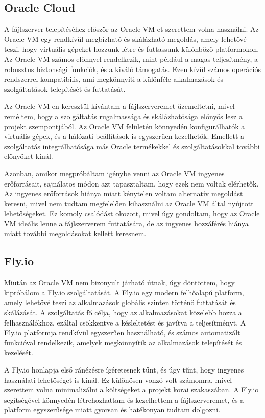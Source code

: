 \subsection{Oracle Cloud}
A fájlszerver telepítéséhez először az Oracle VM-et \cite{CloudInf58:online} szerettem volna használni. Az Oracle VM egy rendkívül megbízható és skálázható megoldás, amely lehetővé teszi, hogy virtuális gépeket hozzunk létre és futtassunk különböző platformokon. Az Oracle VM számos előnnyel rendelkezik, mint például a magas teljesítmény, a robusztus biztonsági funkciók, és a kiváló támogatás. Ezen kívül számos operációs rendszerrel kompatibilis, ami megkönnyíti a különféle alkalmazások és szolgáltatások telepítését és futtatását.

Az Oracle VM-en keresztül kívántam a fájlszerveremet üzemeltetni, mivel reméltem, hogy a szolgáltatás rugalmassága és skálázhatósága előnyös lesz a projekt szempontjából. Az Oracle VM felületén könnyedén konfigurálhatók a virtuális gépek, és a hálózati beállítások is egyszerűen kezelhetők. Emellett a szolgáltatás integrálhatósága más Oracle termékekkel és szolgáltatásokkal további előnyöket kínál.

Azonban, amikor megpróbáltam igénybe venni az Oracle VM ingyenes erőforrásait, sajnálatos módon azt tapasztaltam, hogy ezek nem voltak elérhetők. Az ingyenes erőforrások hiánya miatt kénytelen voltam alternatív megoldást keresni, mivel nem tudtam megfelelően kihasználni az Oracle VM által nyújtott lehetőségeket. Ez komoly csalódást okozott, mivel úgy gondoltam, hogy az Oracle VM ideális lenne a fájlszerverem futtatására, de az ingyenes hozzáférés hiánya miatt további megoldásokat kellett keresnem.


\subsection{Fly.io}
Miután az Oracle VM nem bizonyult járható útnak, úgy döntöttem, hogy kipróbálom a Fly.io \cite{Deployap0:online} szolgáltatását.
A Fly.io egy modern felhőalapú platform, amely lehetővé teszi az alkalmazások globális szinten történő futtatását és skálázását. A szolgáltatás fő célja, hogy az alkalmazásokat közelebb hozza a felhasználókhoz, ezáltal csökkentve a késleltetést és javítva a teljesítményt. A Fly.io platformja rendkívül egyszerűen használható, és számos automatizált funkcióval rendelkezik, amelyek megkönnyítik az alkalmazások telepítését és kezelését.

A Fly.io honlapja első ránézésre ígéretesnek tűnt, és úgy tűnt, hogy ingyenes használati lehetőséget is kínál. Ez különösen vonzó volt számomra, mivel szerettem volna minimalizálni a költségeket a projekt korai szakaszában. A Fly.io segítségével könnyedén létrehozhattam és kezelhettem a fájlszerveremet, és a platform egyszerűsége miatt gyorsan és hatékonyan tudtam dolgozni.

